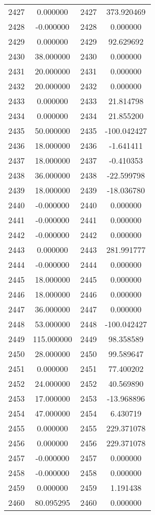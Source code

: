 \documentclass[12pt]{article}
\begin{document}
\begin{longtable}{@{}cccc@{}}
2427 & 0.000000 & 2427 & 373.920469 \\
2428 & -0.000000 & 2428 & 0.000000 \\
2429 & 0.000000 & 2429 & 92.629692 \\
2430 & 38.000000 & 2430 & 0.000000 \\
2431 & 20.000000 & 2431 & 0.000000 \\
2432 & 20.000000 & 2432 & 0.000000 \\
2433 & 0.000000 & 2433 & 21.814798 \\
2434 & 0.000000 & 2434 & 21.855200 \\
2435 & 50.000000 & 2435 & -100.042427 \\
2436 & 18.000000 & 2436 & -1.641411 \\
2437 & 18.000000 & 2437 & -0.410353 \\
2438 & 36.000000 & 2438 & -22.599798 \\
2439 & 18.000000 & 2439 & -18.036780 \\
2440 & -0.000000 & 2440 & 0.000000 \\
2441 & -0.000000 & 2441 & 0.000000 \\
2442 & -0.000000 & 2442 & 0.000000 \\
2443 & 0.000000 & 2443 & 281.991777 \\
2444 & -0.000000 & 2444 & 0.000000 \\
2445 & 18.000000 & 2445 & 0.000000 \\
2446 & 18.000000 & 2446 & 0.000000 \\
2447 & 36.000000 & 2447 & 0.000000 \\
2448 & 53.000000 & 2448 & -100.042427 \\
2449 & 115.000000 & 2449 & 98.358589 \\
2450 & 28.000000 & 2450 & 99.589647 \\
2451 & 0.000000 & 2451 & 77.400202 \\
2452 & 24.000000 & 2452 & 40.569890 \\
2453 & 17.000000 & 2453 & -13.968896 \\
2454 & 47.000000 & 2454 & 6.430719 \\
2455 & 0.000000 & 2455 & 229.371078 \\
2456 & 0.000000 & 2456 & 229.371078 \\
2457 & -0.000000 & 2457 & 0.000000 \\
2458 & -0.000000 & 2458 & 0.000000 \\
2459 & 0.000000 & 2459 & 1.191438 \\
2460 & 80.095295 & 2460 & 0.000000 \\

\end{longtable}
\end{document}
